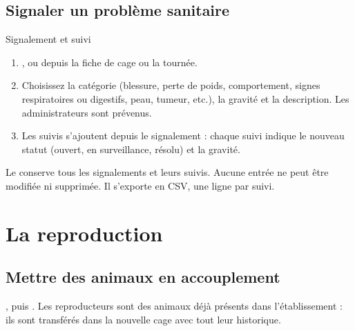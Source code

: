 \documentclass[11pt,a4paper]{article}
\begin{document}
\subsection{Signaler un problème sanitaire}
\begin{procedure}{Signalement et suivi}
\begin{enumerate}
  \item {}, ou depuis la fiche
    de cage ou la tournée.
  \item Choisissez la catégorie (blessure, perte de poids, comportement,
    signes respiratoires ou digestifs, peau, tumeur, etc.), la gravité et la
    description. Les administrateurs sont prévenus.
  \item Les suivis s'ajoutent depuis le signalement : chaque suivi indique le
    nouveau statut (ouvert, en surveillance, résolu) et la gravité.
\end{enumerate}
\end{procedure}
\begin{trace}
Le  conserve tous les signalements et leurs suivis.
Aucune entrée ne peut être modifiée ni supprimée. Il s'exporte en CSV, une
ligne par suivi.
\end{trace}

\section{La reproduction}\label{sec:portees}

\subsection{Mettre des animaux en accouplement}\label{sec:accouplement}
, puis . Les reproducteurs sont des animaux déjà présents dans
l'établissement : ils sont transférés dans la nouvelle cage avec tout leur
historique.
\end{document}
